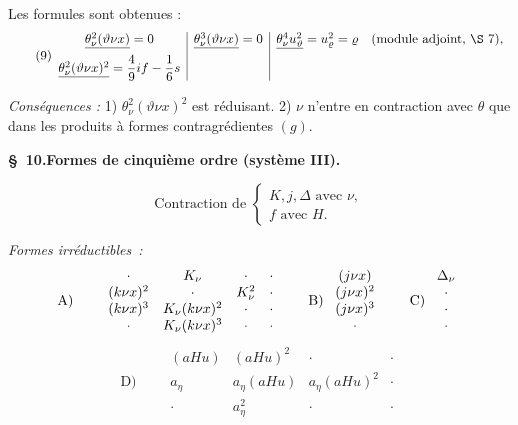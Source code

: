 \documentclass[11pt]{article}
\newcommand{\A}{\Delta}
\begin{document}
Les formules sont obtenues :
\[
\tag{9}
\begin{array}{c|c|c}
\underline{\theta_\nu^2(\vartheta\nu x)}=0
& \underline{\theta_\nu^3(\vartheta\nu x)}=0
& \underline{\theta_\nu^4u_\vartheta^2}=u_\varrho^2=\varrho\quad(\text{module adjoint, \S\ 7}),\\[0.6em]
\underline{\theta_\nu^2(\vartheta\nu x)^2}=\dfrac49 i f-\dfrac16s
& &
\end{array}
\]

\noindent\emph{Conséquences :} 1) $\theta_\nu^2(\vartheta\nu x)^2$ est réduisant. 2) $\nu$ n'entre en contraction avec $\theta$ que dans les produits à formes contragrédientes $(g)$.

\begin{center}
\textbf{\S\ 10.\quad Formes de cinquième ordre (système III).}
\end{center}

\[
\text{Contraction de }\left\{\begin{array}{l}
K,j,\A \text{ avec }\nu,\\
f\text{ avec }H.
\end{array}\right.
\]

\noindent\emph{Formes irréductibles :}
\[
\begin{array}{c@{\qquad}c@{\qquad}c@{\qquad}c}
\text{A)} & \begin{array}{cccc}
\cdot&K_\nu&\cdot&\cdot\\
(k\nu x)^2&\cdot&K_\nu^2&\cdot\\
(k\nu x)^3&K_\nu(k\nu x)^2&\cdot&\cdot\\
\cdot&K_\nu(k\nu x)^3&\cdot&\cdot
\end{array}
&
\text{B)}\ \begin{array}{c}(j\nu x)\\(j\nu x)^2\\(j\nu x)^3\\ \cdot\end{array}
&
\text{C)}\ \begin{array}{c}\A_\nu\\\cdot\\\cdot\\\cdot\end{array}
\end{array}
\]
\[
\text{D)}\qquad
\begin{array}{cccc}
(aHu)&(aHu)^2&\cdot&\cdot\\
a_\eta&a_\eta(aHu)&a_\eta(aHu)^2&\cdot\\
\cdot&a_\eta^2&\cdot&\cdot
\end{array}
\]
\end{document}
